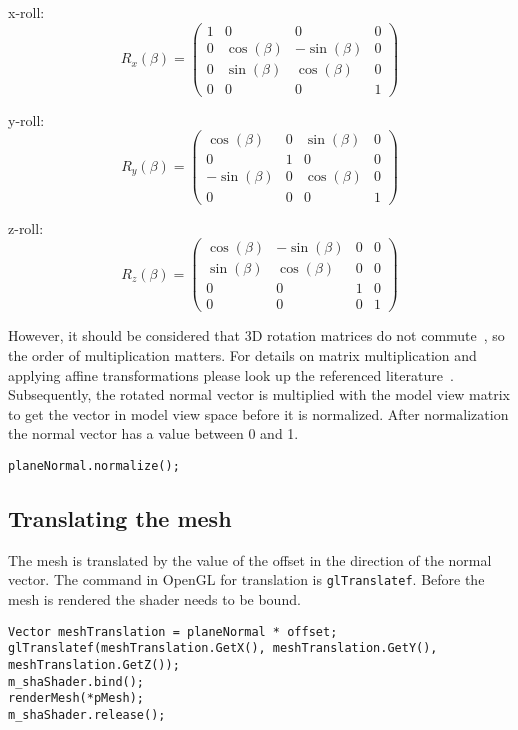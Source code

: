 x-roll:
\begin{equation}
R_{x}(\beta) = 
\begin{pmatrix} 
	1 & 0 & 0 & 0 \\ 
	0 & \cos(\beta) & -\sin(\beta) & 0 \\ 
	0 & \sin(\beta) & \cos(\beta) & 0 \\ 
	0 & 0 & 0 & 1 
\end{pmatrix}
\end{equation}

y-roll:
\begin{equation}
R_{y}(\beta) =
\begin{pmatrix} 
	\cos(\beta) & 0 & \sin(\beta) & 0 \\
	0 & 1 & 0 & 0 \\
	-\sin(\beta) & 0 & \cos(\beta) & 0 \\
	0 & 0 & 0 & 1
\end{pmatrix}
\end{equation}

z-roll:
\begin{equation}
R_{z}(\beta) =
\begin{pmatrix} 
	\cos(\beta) & -\sin(\beta) & 0 & 0 \\
	\sin(\beta) & \cos(\beta) & 0 & 0 \\
	0 & 0 & 1 & 0 \\
	0 & 0 & 0 & 1
\end{pmatrix}
\end{equation}

However, it should be considered that 3D rotation matrices do not commute~\cite{book:computerGraphicsHill}, so the order of multiplication matters. For details on matrix multiplication and applying affine transformations please look up the referenced literature~\cite{book:computerGraphicsHearn}\cite{book:computerGraphicsHill}. Subsequently, the rotated normal vector is multiplied with the model view matrix to get the vector in model view space before it is normalized. After normalization the normal vector has a value between 0 and 1.
\begin{lstlisting}
planeNormal.normalize();
\end{lstlisting}

\subsection{Translating the mesh}
The mesh is translated by the value of the offset in the direction of the normal vector. The command in OpenGL for translation is \texttt{glTranslatef}. Before the mesh is rendered the shader needs to be bound.
\begin{lstlisting}
Vector meshTranslation = planeNormal * offset;
glTranslatef(meshTranslation.GetX(), meshTranslation.GetY(), meshTranslation.GetZ());
m_shaShader.bind();
renderMesh(*pMesh);
m_shaShader.release();
\end{lstlisting}

